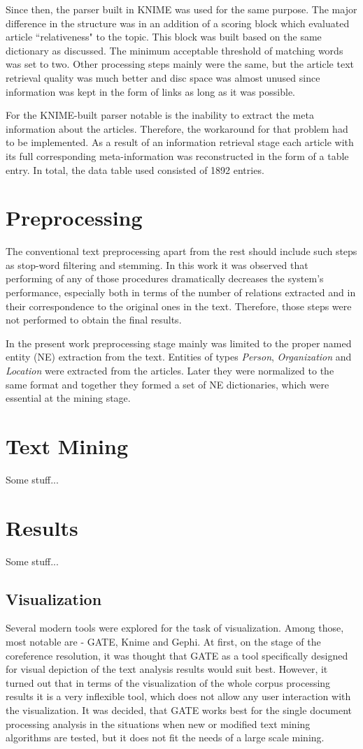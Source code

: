 \documentclass[]{article}
\begin{document}
Since then, the parser built in KNIME was used for the same purpose. The major difference in the structure was in an addition of a scoring block which evaluated article ``relativeness" to the topic. This block was built based on the same dictionary as discussed. The minimum acceptable threshold of matching words was set to two. Other processing steps mainly were the same, but the article text retrieval quality was much better and disc space was almost unused since information was kept in the form of links as long as it was possible. 

For the KNIME-built parser notable is the inability to extract the meta information about the articles. Therefore, the workaround for that problem had to be implemented. As a result of an information retrieval stage each article with its full corresponding meta-information was reconstructed in the form of a table entry. In total, the data table used consisted of 1892 entries.
%
\section{Preprocessing}
%
The conventional text preprocessing apart from the rest should include such steps as stop-word filtering and stemming. In this work it was observed that performing of any of those procedures dramatically decreases the system's performance, especially both in terms of the number of relations extracted and in their correspondence to the original ones in the text. Therefore, those steps were not performed to obtain the final results.

In the present work preprocessing stage mainly was limited to the proper named entity (NE) extraction from the text. Entities of types \textit{Person}, \textit{Organization} and \textit{Location} were extracted from the articles. Later they were normalized to the same format and together they formed a set of NE dictionaries, which were essential at the mining stage.
%
\section{Text Mining}
%
Some stuff...
%
\section{Results}
%
Some stuff...
% 
\subsection{Visualization}
%
Several modern tools were explored for the task of visualization. Among those, most notable are - GATE, Knime and Gephi. At first, on the stage of the coreference resolution, it was thought that GATE as a tool specifically designed for visual depiction of the text analysis results would suit best. However, it turned out that in terms of the visualization of the whole corpus processing results it is a very inflexible tool, which does not allow any user interaction with the visualization. It was decided, that GATE works best for the single document processing analysis in the situations when new or modified text mining algorithms are tested, but it does not fit the needs of a large scale mining.
\end{document}
